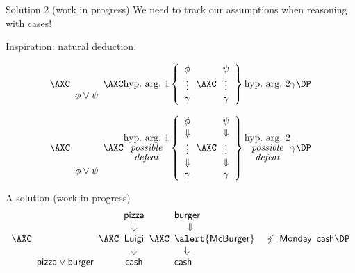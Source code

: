 \documentclass[aspectratio=169]{beamer}
\begin{document}
\begin{frame}[label={sec:org6b86e0c}]{Solution 2 (work in progress)}
We need to track our assumptions when reasoning with cases!

Inspiration: natural deduction.

\vspace{-.5cm}

\[
\axs{\array{c} \phantom{M} \\ \phantom{M} \\ \phi \vee \psi \endarray}
\axs{\mbox{hyp.~arg.~1} \left\{ \array{c} \phi \\ \vdots \\ \gamma \endarray \right.}
\axs{\left. \array{c} \psi \\ \vdots \\ \gamma \endarray \right\} \mbox{hyp.~arg.~2} }
\irl3{RbC}{\gamma}
\DP
\]

\pause

\[
\axs{\array{c} \phantom{M} \\ \phantom{M} \\ \phantom{M} \\ \phantom{M} \\ \phi \vee \psi \endarray}
\axs{\substack{\mbox{hyp.~arg.~1} \\ \mbox{\it possible} \\ \mbox{\it defeat}} \left\{ \array{c} \phi \\ \Downarrow \\ \vdots \\ \Downarrow \\ \gamma \endarray \right.}
\axs{\left. \array{c} \psi \\ \Downarrow \\ \vdots \\ \Downarrow \\ \gamma \endarray \right\} \substack{\mbox{hyp.~arg.~2} \\ \mbox{\it possible} \\ \mbox{\it defeat}} }
\irl3{RbC}{\gamma}
\DP
\]
\end{frame}
\begin{frame}[label={sec:org0c5900f}]{A solution (work in progress)}
\[
\axs{\array{c} \phantom{M} \\ \phantom{M} \\ \phantom{M} \\ \phantom{M} \\ \mathsf{pizza} \vee \mathsf{burger} \endarray}
\axs{\array{c} \mathsf{pizza} \\ \Downarrow \\ \mathsf{Luigi} \\ \Downarrow \\ \mathsf{cash} \endarray}
\axs{\array{l} \mathsf{burger} \\ ~~~~\Downarrow \\ \alert{\mathsf{McBurger}} \quad \not\Leftarrow \mathsf{Monday} \\ ~~~\Downarrow \\ \mathsf{cash} \endarray}
\irl3{RbC}{\mathsf{cash}}
\DP
\]
\end{frame}
\end{document}
